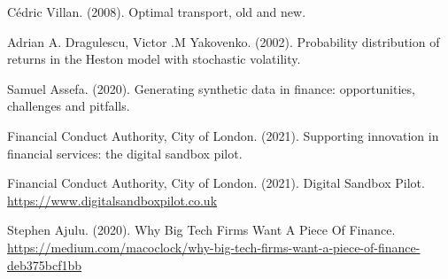 \documentclass[runningheads]{llncs}
\begin{document}
\begin{thebibliography}{8}
Cédric Villan. (2008). Optimal transport, old and new.

Adrian A. Dragulescu, Victor .M Yakovenko. (2002). Probability distribution of returns in the Heston model with stochastic volatility.

Samuel Assefa. (2020). Generating synthetic data in finance: opportunities, challenges and pitfalls.

Financial Conduct Authority, City of London. (2021). Supporting innovation in financial services: the digital sandbox pilot.

Financial Conduct Authority, City of London. (2021). Digital Sandbox Pilot.
\url{https://www.digitalsandboxpilot.co.uk}

Stephen Ajulu. (2020). Why Big Tech Firms Want A Piece Of Finance.
\url{https://medium.com/macoclock/why-big-tech-firms-want-a-piece-of-finance-deb375bcf1bb}

\end{thebibliography}
\end{document}
